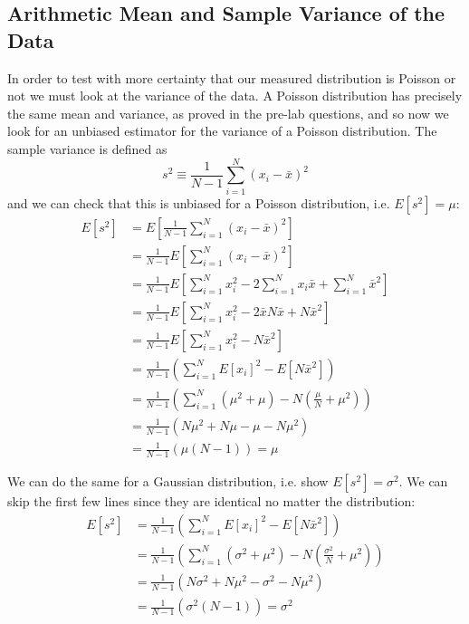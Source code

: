 \documentclass[12pt]{article}
\numberwithin{equation}{section}
\numberwithin{figure}{section}
\numberwithin{table}{section}
\begin{document}
\subsection{Arithmetic Mean and Sample Variance of the Data}\label{sec:Sample Variance}
\par In order to test with more certainty that our measured distribution is Poisson or not we must look at the variance of the data. A Poisson distribution has precisely the same mean and variance, as proved in the pre-lab questions, and so now we look for an unbiased estimator for the variance of a Poisson distribution. The sample variance is defined as 
\begin{equation}
    s^2\equiv\frac{1}{N-1}\sum_{i=1}^N (x_i-\bar{x})^2
    \label{eqn:Sample Variance}
\end{equation}
and we can check that this is unbiased for a Poisson distribution, i.e. $E[s^2]=\mu$:
\begin{align*}
    E[s^2]&=E\left[\frac{1}{N-1}\sum_{i=1}^N (x_i-\bar{x})^2\right]\\
    &=\frac{1}{N-1}E\left[\sum_{i=1}^N (x_i-\bar{x})^2\right]\\
    &=\frac{1}{N-1}E\left[\sum_{i=1}^N x_i^2 -2\sum_{i=1}^N x_i\bar{x} + \sum_{i=1}^N \bar{x}^2\right]\\
    &=\frac{1}{N-1}E\left[\sum_{i=1}^N x_i^2-2\bar{x}N\bar{x}+N\bar{x}^2\right]\\
    &=\frac{1}{N-1}E\left[\sum_{i=1}^N x_i^2-N\bar{x}^2\right]\\
    &=\frac{1}{N-1}\left(\sum_{i=1}^N E[x_i]^2-E[N\bar{x}^2]\right)\\
    &=\frac{1}{N-1}\left(\sum_{i=1}^N(\mu^2+\mu)-N\left(\frac{\mu}{N}+\mu^2\right)\right)\\
    &=\frac{1}{N-1}(N\mu^2+N\mu-\mu-N\mu^2)\\
    &=\frac{1}{N-1}(\mu(N-1))=\mu
\end{align*}
\par We can do the same for a Gaussian distribution, i.e. show $E[s^2]=\sigma^2$. We can skip the first few lines since they are identical no matter the distribution:
\begin{align*}
    E[s^2]&=\frac{1}{N-1}\left(\sum_{i=1}^N E[x_i]^2-E[N\bar{x}^2]\right)\\
    &=\frac{1}{N-1}\left(\sum_{i=1}^N (\sigma^2+\mu^2) -N\left(\frac{\sigma^2}{N}+\mu^2\right)\right)\\
    &=\frac{1}{N-1}(N\sigma^2+N\mu^2-\sigma^2-N\mu^2)\\
    &=\frac{1}{N-1}(\sigma^2(N-1))=\sigma^2
\end{align*}
\end{document}
